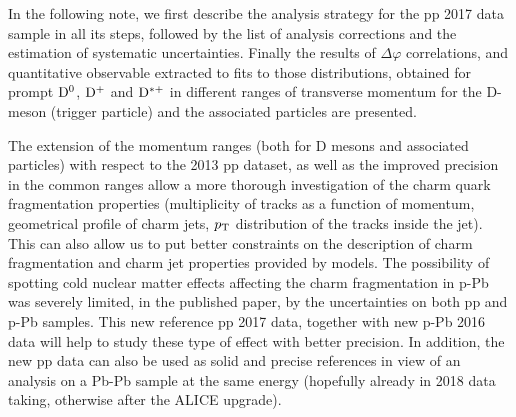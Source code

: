In the following note, we first describe the analysis strategy for the pp 2017 data sample in all its steps, followed by the list of analysis corrections and the estimation of systematic uncertainties. Finally the results of $\Delta\varphi$ correlations, and quantitative observable extracted to fits to those distributions, obtained for prompt $\rm{D^0}$, $\rm{D^{+}}$ and $\rm{D^{*+}}$ in different ranges of transverse momentum for the D-meson (trigger particle) and the associated particles are presented.

The extension of the momentum ranges (both for D mesons and associated particles) with respect to the 2013 pp dataset, as well as the improved precision in the common ranges allow a more thorough investigation of the charm quark fragmentation properties (multiplicity of tracks as a function of momentum, geometrical profile of charm jets, $p_{\rm T}$ distribution of the tracks inside the jet). This can also allow us to put better constraints on the description of charm fragmentation and charm jet properties provided by models.
The possibility of spotting cold nuclear matter effects affecting the charm fragmentation in p-Pb was severely limited, in the published paper, by the uncertainties on both pp and p-Pb samples. This new reference pp 2017 data, together with new p-Pb 2016 data will help to study these type of effect with better precision.
In addition, the new pp data can also be used as solid and precise references in view of an analysis on a Pb-Pb sample at the same energy (hopefully already in 2018 data taking, otherwise after the ALICE upgrade).

